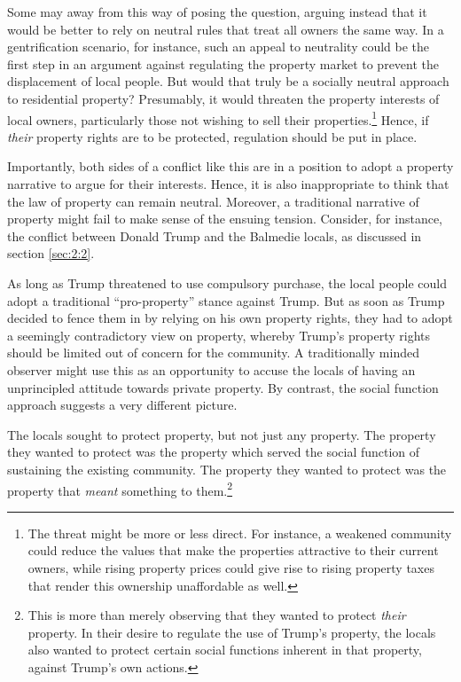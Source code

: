 Some may  away from this way of posing the question,  arguing instead that it would be better to rely on neutral rules that treat all owners the same way. In a gentrification scenario, for instance, such an appeal to neutrality could be the first step in an argument against regulating the property market to prevent the displacement of local people. But would that truly be a socially neutral approach to residential property? Presumably, it would threaten the property interests of local owners, particularly those not wishing to sell their properties.\footnote{The threat might be more or less direct. For instance, a weakened community could reduce the values that make the properties attractive to their current owners, while rising property prices could give rise to rising property taxes that render this ownership unaffordable as well.} Hence, if {\it their} property rights are to be protected, regulation should be put in place.

Importantly, both sides of a conflict like this are in a position to adopt a property narrative to argue for their interests. Hence, it is also inappropriate to think that the law of property can remain neutral. Moreover, a traditional narrative of property might fail to make sense of the ensuing tension. Consider, for instance, the conflict between Donald Trump and the Balmedie locals, as discussed in section \ref{sec:2:2}.

As long as Trump threatened to use compulsory purchase, the local people could adopt a traditional ``pro-property'' stance against Trump. But as soon as Trump decided to fence them in by relying on his own property rights, they had to adopt a seemingly contradictory view on property, whereby Trump's property rights should be limited out of concern for the community. A traditionally minded observer might use this as an opportunity to accuse the locals of having an unprincipled attitude towards private property. By contrast, the social function approach suggests a very different picture.

The locals sought to protect property, but not just any property. The property they wanted to protect was the property which served the social function of sustaining the existing community. The property they wanted to protect was the property that {\it meant} something to them.\footnote{This is more than merely observing that they wanted to protect {\it their} property. In their desire to regulate the use of Trump's property, the locals also wanted to protect certain social functions inherent in that property, against Trump's own actions.} 

